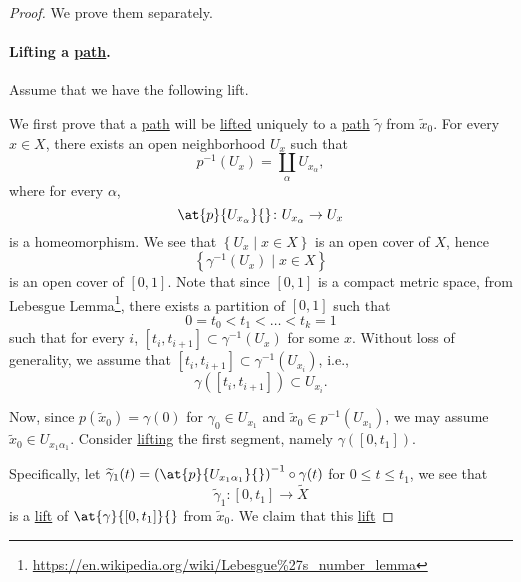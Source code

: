 \begin{proof}
	We prove them separately.
	\paragraph{Lifting a \hyperref[def:path]{path}.} Assume that we have the following lift.
	\begin{figure}[H]
		\centering
		\label{fig:pf:col:lec14}
	\end{figure}
	We first prove that a \hyperref[def:path]{path} will be \hyperref[prop:homotopy-lifting-property]{lifted} uniquely to a \hyperref[def:path]{path} \(\widetilde{\gamma} \)
	from \(\widetilde{x} _0\). For every \(x\in X\), there exists an open neighborhood \(U_x\) such that
	\[
		p^{-1} (U_{x} ) = \coprod\limits_{\alpha }U_{x_\alpha },
	\]
	where for every \(\alpha \),
	\[
		\at{p}{U_{x_\alpha }}{} \colon U_{x_{\alpha }}\to U_{x}
	\]
	is a homeomorphism. We see that \(\left\{U_{x} \mid x\in X\right\}\) is an open cover of \(X\), hence
	\[
		\left\{\gamma ^{-1} (U_{x} )\mid x\in X\right\}
	\]
	is an open cover of \([0, 1]\). Note that since \([0, 1]\) is a compact metric space, from Lebesgue Lemma\footnote{\url{https://en.wikipedia.org/wiki/Lebesgue\%27s_number_lemma}},
	there exists a partition of \([0, 1]\) such that
	\[
		0 = t_0 < t_1 < \ldots  < t_{k} = 1
	\]
	such that for every \(i\), \([t_{i} , t_{i+1}]\subset \gamma ^{-1} (U_{x} ) \) for some \(x\). Without loss of generality, we assume that \([t_{i} , t_{i+1}]\subset \gamma ^{-1} (U_{x_{i}})\),
	i.e.,
	\[
		\gamma ([t_{i} , t_{i+1}])\subset U_{x_{i} }.
	\]
	\begin{figure}[H]
		\centering
		\label{fig:pf:col:lec14-2}
	\end{figure}
	Now, since \(p(\widetilde{x} _0) = \gamma (0)\) for \(\gamma _0\in U_{x_1}\) and \(\widetilde{x} _0\in p^{-1} (U_{x_1})\), we may assume \(\widetilde{x} _0\in U_{x_1 \alpha _1}\).
	Consider \hyperref[prop:homotopy-lifting-property]{lifting} the first segment, namely \(\gamma ([0, t_1])\).
	\begin{figure}[H]
		\centering
		\label{fig:pf:col:lec14-3}
	\end{figure}
	Specifically, let \(\widetilde{\gamma}_1 (t) = \left(\at{p}{U_{x_1 \alpha _1}}{}\right)^{-1} \circ \gamma (t) \) for \(0\leq t\leq t_1\), we see that
	\[
		\widetilde{\gamma} _1\colon [0, t_1]\to \widetilde{X}
	\]
	is a \hyperref[prop:homotopy-lifting-property]{lift} of \(\at{\gamma }{[0, t_1]}{} \) from \(\widetilde{x} _0\). We claim that this \hyperref[prop:homotopy-lifting-property]{lift}

\end{proof}
